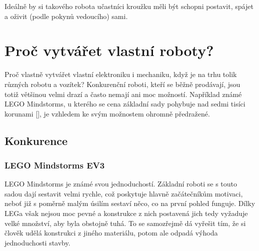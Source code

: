 \documentclass{template/socthesis}
\begin{document}
Ideálně by si takového robota učastníci kroužku měli být schopni postavit, spájet a oživit (podle pokynů vedoucího) sami. 





\newpage

\chapter{Proč vytvářet vlastní roboty?}

Proč vlastně vytvářet vlastní elektroniku i mechaniku, když je na trhu tolik různých robotu a vozítek? Konkurenční roboti, kteří se běžně prodávají, jsou totiž většinou velmi drazí a často nemají ani moc možností. Například známé LEGO Mindstorms, u kterého se cena základní sady pohybuje nad sedmi tisíci korunami [], %
 je vzhledem ke svým možnostem ohromně předražené.
 

\section{Konkurence} \label{konkurence}

\subsection{LEGO Mindstorms EV3}

LEGO Mindstorms je známé svou jednoduchostí. Základní roboti se s touto sadou dají sestavit velmi rychle, což poskytuje hlavně začátečníkům motivaci, neboť již s poměrně malým úsilím sestaví něco, co na první pohled funguje. Dílky LEGa však nejsou moc pevné a konstrukce z nich postavená jich tedy vyžaduje velké množství, aby byla obstojně tuhá. To se samozřejmě dá vyřešit tím, že si člověk udělá konstrukci z jiného materiálu, potom ale odpadá výhoda jednoduchosti stavby.
\end{document}
